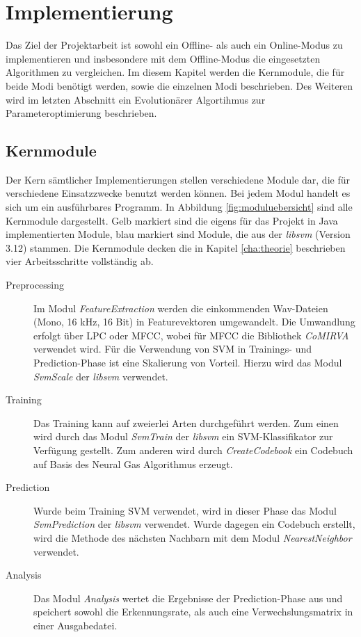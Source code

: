 \chapter{Implementierung}
Das Ziel der Projektarbeit ist sowohl ein Offline- als auch ein Online-Modus zu implementieren und insbesondere mit dem Offline-Modus die eingesetzten Algorithmen zu vergleichen. Im diesem Kapitel werden die Kernmodule, die für beide Modi benötigt werden, sowie die einzelnen Modi beschrieben. Des Weiteren wird im letzten Abschnitt ein Evolutionärer Algortihmus zur Parameteroptimierung beschrieben.

\section{Kernmodule}
Der Kern sämtlicher Implementierungen stellen verschiedene Module dar, die für verschiedene Einsatzzwecke benutzt werden können. Bei jedem Modul handelt es sich um ein ausführbares Programm. In Abbildung \ref{fig:moduluebersicht} sind alle Kernmodule dargestellt. Gelb markiert sind die eigens für das Projekt in Java implementierten Module, blau markiert sind Module, die aus der \emph{libsvm} (Version 3.12) stammen. Die Kernmodule decken die in Kapitel \ref{cha:theorie} beschrieben vier Arbeitsschritte vollständig ab. 

\begin{description}
	\item[Preprocessing] Im Modul \emph{FeatureExtraction} werden die einkommenden Wav-Dateien (Mono, 16 kHz, 16 Bit) in Featurevektoren umgewandelt. Die Umwandlung erfolgt über LPC oder MFCC, wobei für MFCC die Bibliothek \emph{CoMIRVA} verwendet wird. \cite{bib:comirva} Für die Verwendung von SVM in Trainings- und Prediction-Phase ist eine Skalierung von Vorteil. Hierzu wird das Modul \emph{SvmScale} der \emph{libsvm} verwendet.
	\item[Training] Das Training kann auf zweierlei Arten durchgeführt werden. Zum einen wird durch das Modul \emph{SvmTrain} der \emph{libsvm} ein SVM-Klassifikator zur Verfügung gestellt. Zum anderen wird durch \emph{CreateCodebook} ein Codebuch auf Basis des Neural Gas Algorithmus erzeugt.
	\item[Prediction] Wurde beim Training SVM verwendet, wird in dieser Phase das Modul \emph{SvmPrediction} der \emph{libsvm} verwendet. Wurde dagegen ein Codebuch erstellt, wird die Methode des nächsten Nachbarn mit dem Modul \emph{NearestNeighbor} verwendet.
	\item[Analysis] Das Modul \emph{Analysis} wertet die Ergebnisse der Prediction-Phase aus und speichert sowohl die Erkennungsrate, als auch eine Verwechslungsmatrix in einer Ausgabedatei.
\end{description}

